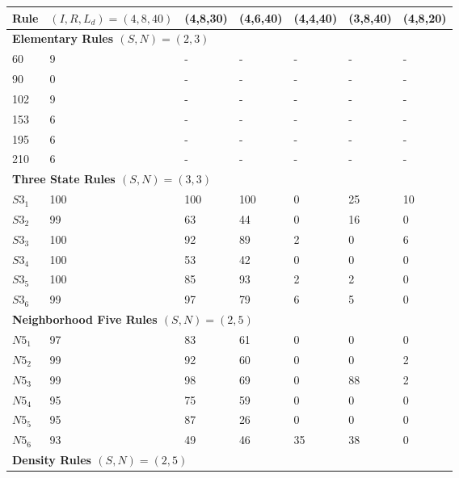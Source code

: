 \documentclass{elsarticle}
\begin{document}
\begin{multicols}{2}
	\begin{table}[!htbp] \centering
		\small
		\begin{tabular}{|l|l|l|l|l|l|l|}
			\hline
			\textbf{Rule} & \textbf{\boldmath$(I,R,L_{d})=(4,8,40)$} & \textbf{(4,8,30)} & 
			\textbf{(4,6,40)} & \textbf{(4,4,40)} & \textbf{(3,8,40)} & \textbf{(4,8,20)} 
			\\ \hline
			\multicolumn{7}{|l|}{\textbf{Elementary Rules \boldmath$(S,N) = (2,3)$}} \\ 
			\hline
			60       & 9   & -   & -   & -  & -  & -  \\ \hline
			90       & 0   & -   & -   & -  & -  & -  \\ \hline
			102      & 9   & -   & -   & -  & -  & -  \\ \hline
			153      & 6   & -   & -   & -  & -  & -  \\ \hline
			195      & 6   & -   & -   & -  & -  & -  \\ \hline
			210      & 6   & -   & -   & -  & -  & -  \\ \hline
			\multicolumn{7}{|l|}{\textbf{Three State Rules \boldmath$(S,N) = (3,3)$}} \\ 
			\hline
			$S3_{1}$ & 100 & 100 & 100 & 0  & 25 & 10 \\ \hline
			$S3_{2}$ & 99  & 63  & 44  & 0  & 16 & 0  \\ \hline
			$S3_{3}$ & 100 & 92  & 89  & 2  & 0  & 6  \\ \hline
			$S3_{4}$ & 100 & 53  & 42  & 0  & 0  & 0  \\ \hline
			$S3_{5}$ & 100 & 85  & 93  & 2  & 2  & 0  \\ \hline
			$S3_{6}$ & 99  & 97  & 79  & 6  & 5  & 0  \\ \hline
			\multicolumn{7}{|l|}{\textbf{Neighborhood Five Rules \boldmath$(S,N) = (2,5)$}} 
			\\ \hline
			$N5_{1}$ & 97  & 83  & 61  & 0  & 0  & 0  \\ \hline
			$N5_{2}$ & 99  & 92  & 60  & 0  & 0  & 2  \\ \hline
			$N5_{3}$ & 99  & 98  & 69  & 0  & 88 & 2  \\ \hline
			$N5_{4}$ & 95  & 75  & 59  & 0  & 0  & 0  \\ \hline
			$N5_{5}$ & 95  & 87  & 26  & 0  & 0  & 0  \\ \hline
			$N5_{6}$ & 93  & 49  & 46  & 35 & 38 & 0  \\ \hline
			\multicolumn{7}{|l|}{\textbf{Density Rules \boldmath$(S,N) = (2,5)$}} \\ \hline

\end{tabular}
\end{table}
\end{multicols}
\end{document}
